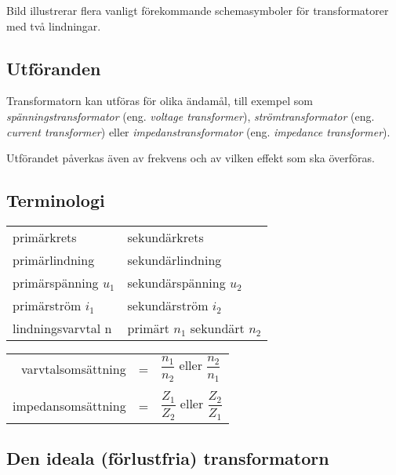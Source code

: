 Bild  illustrerar flera vanligt förekommande schemasymboler
för transformatorer med två lindningar.


\subsection{Utföranden}

Transformatorn kan utföras för olika ändamål, till exempel som
\emph{spänningstransformator} (eng. \emph{voltage transformer}),
\emph{strömtransformator} (eng. \emph{current transformer}) eller
\emph{impedanstransformator} (eng. \emph{impedance transformer}).

Utförandet påverkas även av frekvens och av vilken effekt som ska överföras.

\subsection{Terminologi}

\begin{center}
\begin{tabular}{ll}
primärkrets & sekundärkrets \\
primärlindning & sekundärlindning \\
primärspänning \(u_1\) &  sekundärspänning \(u_2\) \\
primärström \(i_1\) & sekundärström \(i_2\) \\
lindningsvarvtal n & primärt \(n_1\) sekundärt \(n_2\)
\end{tabular}
\end{center}

\begin{tabular}{rcl}
varvtalsomsättning &=& \(\dfrac{n_1}{n_2}\) eller \(\dfrac{n_2}{n_1}\) \\
&&\\
impedansomsättning &=& \(\dfrac{Z_1}{Z_2}\) eller \(\dfrac{Z_2}{Z_1}\) \\
\end{tabular}

\newpage
\subsection{Den ideala (förlustfria) transformatorn}
\label{ideal_transformator}

